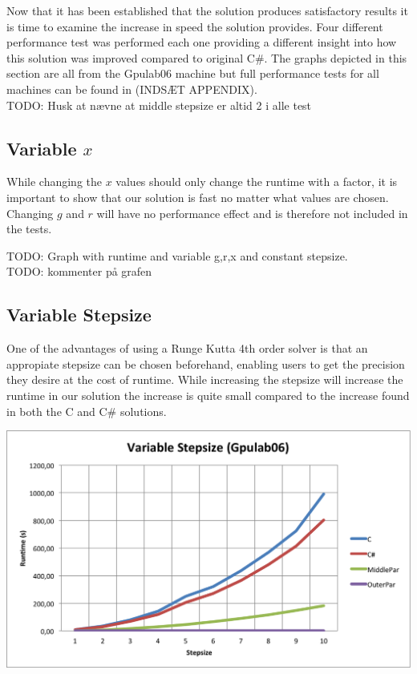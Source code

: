 
Now that it has been established that the solution produces satisfactory results it is time to examine the increase in speed the solution provides. Four different performance test was performed each one providing a different insight into how this solution was improved compared to original C\#. The graphs depicted in this section are all from the Gpulab06 machine but full performance tests for all machines can be found in (INDSÆT APPENDIX). \\

TODO: Husk at nævne at middle stepsize er altid 2 i alle test

\subsection{Variable $x$}
While changing the $x$ values should only change the runtime with a factor, it is important to show that our solution is fast no matter what values are chosen. Changing $g$ and $r$ will have no performance effect and is therefore not included in the tests.

TODO: Graph with runtime and variable g,r,x and constant stepsize. \\
TODO: kommenter på grafen

\subsection{Variable Stepsize}
One of the advantages of using a Runge Kutta 4th order solver is that an appropiate stepsize can be chosen beforehand, enabling users to get the precision they desire at the cost of runtime. While increasing the stepsize will increase the runtime in our solution the increase is quite small compared to the increase found in both the C and C\# solutions.

\begin{center}
	\includegraphics[width=\textwidth]{img/Gpulab-stepsize.png}
\end{center}

